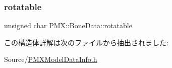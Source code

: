 \mbox{\label{struct_p_m_x_1_1_bone_data_a3cfa69d4ac03c7476ae4559161df0d8f}} 
\subsubsection{\texorpdfstring{rotatable}{rotatable}}
{\footnotesize\ttfamily unsigned char P\+M\+X\+::\+Bone\+Data\+::rotatable}



この構造体詳解は次のファイルから抽出されました\+:\begin{DoxyCompactItemize}
\item 
Source/\mbox{\hyperlink{_p_m_x_model_data_info_8h}{P\+M\+X\+Model\+Data\+Info.\+h}}\end{DoxyCompactItemize}
